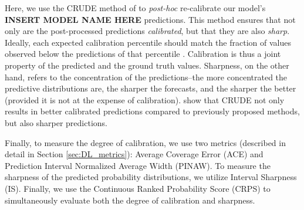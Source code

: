 Here, we use the CRUDE method of \cite{crude_probability_calibration} to \emph{post-hoc} re-calibrate our model's \textbf{INSERT MODEL NAME HERE} predictions. This method ensures that not only are the post-processed predictions \emph{calibrated}, but that they are also \emph{sharp}. Ideally, each expected calibration percentile should match the fraction of values observed below the predictions of that percentile \citep{measuring_calibration_in_deep_learning}. Calibration is thus a joint property of the predicted and the ground truth values. Sharpness, on the other hand, refers to the concentration of the predictions--the more concentrated the predictive distributions are, the sharper the forecasts, and the sharper the better (provided it is not at the expense of calibration). \cite{crude_probability_calibration} show that CRUDE not only results in better calibrated predictions compared to previously proposed methods, but also sharper predictions.

Finally, to measure the degree of calibration, we use two metrics (described in detail in Section \ref{sec:DL_metrics}): Average Coverage Error (ACE) and Prediction Interval Normalized Average Width (PINAW). To measure the sharpness of the predicted probability distributions, we utilize Interval Sharpness (IS). Finally, we use the Continuous Ranked Probability Score (CRPS) to simultaneously evaluate both the degree of calibration and sharpness. %
\fi